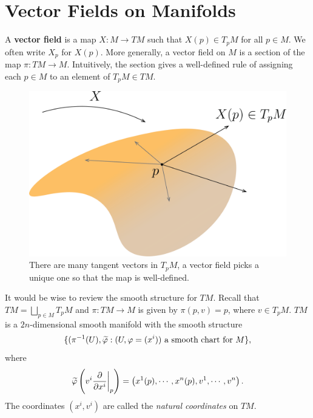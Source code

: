 \section{Vector Fields on Manifolds}
A \textbf{vector field} is a map $X:M \to TM$ such that $X(p) \in T_pM$ for all $p \in M$. We often write $X_p$ for $X(p)$. 
More generally, a vector field on $M$ is a section of the map $\pi:TM \to M$. Intuitively, the section gives a well-defined rule of assigning each $p \in M$ to an element of $T_pM \in TM$. 
\begin{figure}[h]
    \centering
    \includegraphics[scale=0.4]{figure/VectorFieldSection.png}
    \caption{There are many tangent vectors in $T_pM$, a vector field picks a unique one so that the map is well-defined. }
\end{figure}

It would be wise to review the smooth structure for $TM$. Recall that $TM = \bigsqcup_{p \in M}T_pM$ and $\pi:TM \to M$ is given by $\pi(p,v) = p$, where $v \in T_pM$. $TM$ is a $2n$-dimensional smooth manifold with the smooth structure 
$$\{(\pi^{-1}(U), \widetilde{\varphi}: (U,\varphi=(x^i)) \text{ a smooth chart for }M \}, $$ where 
$$\widetilde{\varphi}\left(v^i \pdv{}{x^i}\bigg|_{p}\right)
  = \left(x^1(p),\cdots,x^n(p),v^1,\cdots,v^n\right).$$
The coordinates $(x^i, v^i)$ are called the \textit{natural coordinates} on $TM$. 


